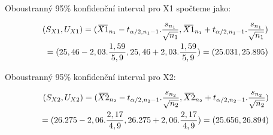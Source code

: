 \documentclass[12pt,a4paper]{article}
\newcommand{\overbar}[1]{\mkern 2.5mu\overline{\mkern-2.5mu#1\mkern-2.5mu}\mkern 2.5mu}
\begin{document}
Oboustranný 95\% konfidenční interval pro X1 spočteme jako:

\begin{gather}
\begin{align}
(S_{X1},U_{X1})
= (\overbar{X1}_{n_1} - t_{\alpha/2,n_1-1}.\frac{s_{n_1}}{\sqrt{n_1}},
  \overbar{X1}_{n_1} + t_{\alpha/2,n_1-1}.\frac{s_{n_1}}{\sqrt{n_1}}) \nonumber\\
= (25,46 - 2,03.\frac{1,59}{5,9},
   25,46 + 2,03.\frac{1,59}{5,9})
= (25.031, 25.895)
\end{align}
\end{gather}

Oboustranný 95\% konfidenční interval pro X2:

\begin{align}
(S_{X2},U_{X2}) = 
(\overbar{X2}_{n_2} - t_{\alpha/2,n_2-1}.\frac{s_{n_2}}{\sqrt{n_2}},
 \overbar{X2}_{n_2} + t_{\alpha/2,n_2-1}.\frac{s_{n_2}	}{\sqrt{n_2}}) \nonumber\\
= (26.275 - 2,06.\frac{2,17}{4,9},
   26.275 + 2,06.\frac{2,17}{4,9})
= (25.656, 26.894)
\end{align}
\end{document}
